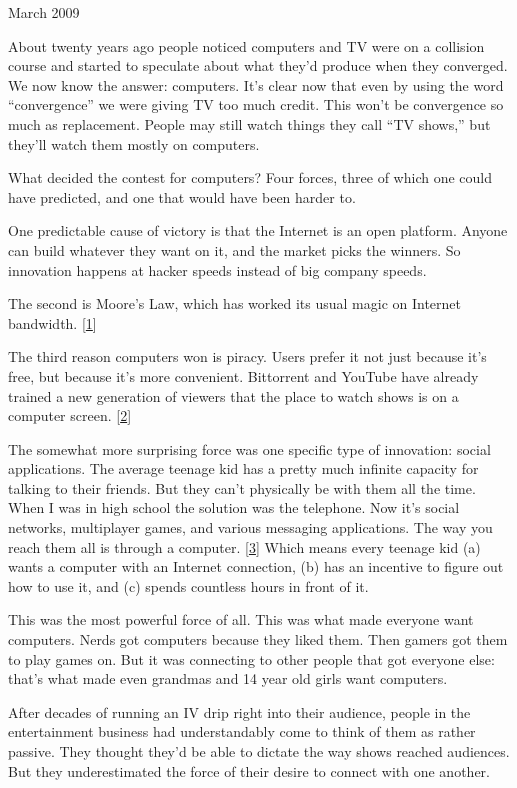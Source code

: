 March 2009

About twenty years ago people noticed computers and TV were on a
collision course and started to speculate about what they'd produce when
they converged. We now know the answer: computers. It's clear now that
even by using the word ``convergence'' we were giving TV too much
credit. This won't be convergence so much as replacement. People may
still watch things they call ``TV shows,'' but they'll watch them mostly
on computers.

What decided the contest for computers? Four forces, three of which one
could have predicted, and one that would have been harder to.

One predictable cause of victory is that the Internet is an open
platform. Anyone can build whatever they want on it, and the market
picks the winners. So innovation happens at hacker speeds instead of big
company speeds.

The second is Moore's Law, which has worked its usual magic on Internet
bandwidth. {[}\hyperref[f1n]{1}{]}

The third reason computers won is piracy. Users prefer it not just
because it's free, but because it's more convenient. Bittorrent and
YouTube have already trained a new generation of viewers that the place
to watch shows is on a computer screen. {[}\hyperref[f2n]{2}{]}

The somewhat more surprising force was one specific type of innovation:
social applications. The average teenage kid has a pretty much infinite
capacity for talking to their friends. But they can't physically be with
them all the time. When I was in high school the solution was the
telephone. Now it's social networks, multiplayer games, and various
messaging applications. The way you reach them all is through a
computer. {[}\hyperref[f3n]{3}{]} Which means every teenage kid (a)
wants a computer with an Internet connection, (b) has an incentive to
figure out how to use it, and (c) spends countless hours in front of it.

This was the most powerful force of all. This was what made everyone
want computers. Nerds got computers because they liked them. Then gamers
got them to play games on. But it was connecting to other people that
got everyone else: that's what made even grandmas and 14 year old girls
want computers.

After decades of running an IV drip right into their audience, people in
the entertainment business had understandably come to think of them as
rather passive. They thought they'd be able to dictate the way shows
reached audiences. But they underestimated the force of their desire to
connect with one another.

